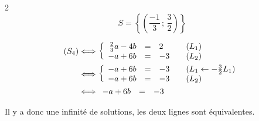 \documentclass[10pt,a4paper,openany,twoside, eleve]{book}
\begin{document}
\begin{multicols}{2}
$$S=\left\{ (\frac{-1}{3}\,;\,\frac{3}{2}) \right\}$$

      \begin{align*}
         (S_4)
         &\Longleftrightarrow \left\{ \begin{array}{rcll} \frac{2}{3}a - 4b&=&2 &\quad (L_1)\\ -a + 6b&=&-3 &\quad (L_2) \end{array} \right. \\
         &\Longleftrightarrow \left\{ \begin{array}{rcll} -a + 6b&=&-3 &\quad (L_1 \leftarrow -\frac{3}{2}L_1)\\ -a + 6b&=&-3 &\quad (L_2) \end{array} \right. \\
         &\Longleftrightarrow \begin{array}{rcl}  -a + 6b&=&-3   \end{array}
         \end{align*}

         Il y a donc une infinité de solutions, les deux lignes sont équivalentes.

	\end{multicols}
   
\end{document}
